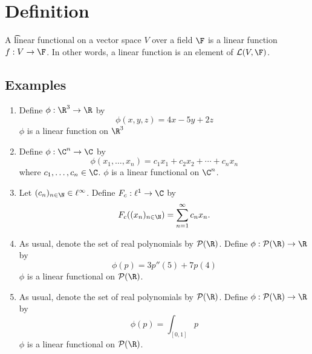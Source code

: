 
\section*{Definition}

A \t{linear functional} on a vector space $V$ over a field $\F $ is a linear function $f: V \to \F $.
In other words, a linear function is an element of $\mathcal{L} (V, \F )$.

\subsection*{Examples}

\begin{enumerate}
  \item Define $\phi : \R ^3 \to \R $ by
\[
\phi (x, y, z) = 4x - 5y + 2z
\]
$\phi $ is a linear function on $\R ^3$
  \item Define $\phi : \C ^n \to \C $ by
\[
\phi (x_1, \dots , x_n) = c_1x_1 + c_2x_2 + \cdots + c_nx_n
\]
where $c_1, \dots , c_n \in \C $.
$\phi $ is a linear functional on $\C ^n$.
  \item Let $(c_n)_{n \in \N  } \in \ell ^{\infty}$. Define $F_c: \ell ^1 \to \C $ by
\[
F_c((x_n)_{n \in \N  }) = \sum_{n = 1}^{\infty} c_n x_n.
\]
  \item As usual, denote the set of real polynomials by $\mathcal{P} (\R )$.
Define $\phi : \mathcal{P} (\R ) \to \R $ by
\[
\phi (p) = 3p''(5) + 7p(4)
\]
$\phi $ is a linear functional on $\mathcal{P} (\R )$.
  \item As usual, denote the set of real polynomials by $\mathcal{P} (\R )$.
Define $\phi : \mathcal{P} (\R ) \to \R $ by
\[
\phi (p) = \int _[0,1] p
\]
$\phi $ is a linear functional on $\mathcal{P} (\R )$.
\end{enumerate}
\blankpage